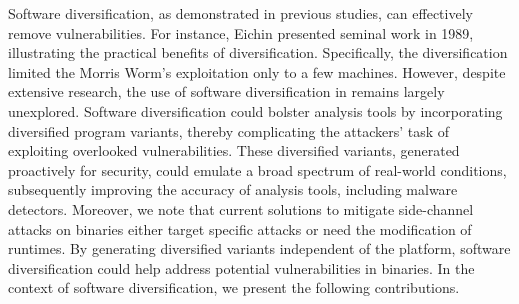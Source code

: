 Software diversification, as demonstrated in previous studies, can effectively remove vulnerabilities. 
For instance, Eichin \etal \cite{36307} presented seminal work in 1989, illustrating the practical benefits of diversification. 
Specifically, the diversification limited the Morris Worm's exploitation only to a few machines. 
However, despite extensive research, the use of software diversification in \Wasm remains largely unexplored. 
Software diversification could bolster \Wasm analysis tools by incorporating diversified program variants, thereby complicating the attackers' task of exploiting overlooked vulnerabilities. 
These diversified variants, generated proactively for security, could emulate a broad spectrum of real-world conditions, subsequently improving the accuracy of \Wasm analysis tools, including \Wasm malware detectors. 
Moreover, we note that current solutions to mitigate side-channel attacks on \Wasm binaries either target specific attacks or need the modification of runtimes. 
By generating diversified variants independent of the platform, software diversification could help address potential vulnerabilities in \Wasm binaries. 
In the context of software diversification, we present the following contributions.

